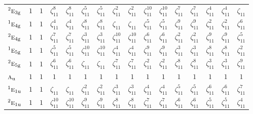 \documentclass[10pt,a4paper]{article}
\numberwithin{equation}{section}
\newcommand{\irr}[1]{\text{\normalfont\scshape #1}}
\newcommand{\conjpair}[1]{{}^{#1}}
\newcommand{\ptag}[1]{\mathrm{#1}}
\newcommand{\rootunity}[1]{\zeta_{#1}}
\begin{document}
{\begin{longtable}{@{}lccccccccccccccc@{}}
$\conjpair{2}\irr{e}_{3\ptag{g}}$ & $1$ & $1$ & $\rootunity{11}^{8}$ & $\rootunity{11}^{8}$ & $\rootunity{11}^{5}$ & $\rootunity{11}^{5}$ & $\rootunity{11}^{2}$ & $\rootunity{11}^{2}$ & $\rootunity{11}^{10}$ & $\rootunity{11}^{10}$ & $\rootunity{11}^{7}$ & $\rootunity{11}^{7}$ & $\rootunity{11}^{4}$ & $\rootunity{11}^{4}$ & $\rootunity{11}$\\
$\conjpair{1}\irr{e}_{4\ptag{g}}$ & $1$ & $1$ & $\rootunity{11}^{4}$ & $\rootunity{11}^{4}$ & $\rootunity{11}^{8}$ & $\rootunity{11}^{8}$ & $\rootunity{11}$ & $\rootunity{11}$ & $\rootunity{11}^{5}$ & $\rootunity{11}^{5}$ & $\rootunity{11}^{9}$ & $\rootunity{11}^{9}$ & $\rootunity{11}^{2}$ & $\rootunity{11}^{2}$ & $\rootunity{11}^{6}$\\
$\conjpair{2}\irr{e}_{4\ptag{g}}$ & $1$ & $1$ & $\rootunity{11}^{7}$ & $\rootunity{11}^{7}$ & $\rootunity{11}^{3}$ & $\rootunity{11}^{3}$ & $\rootunity{11}^{10}$ & $\rootunity{11}^{10}$ & $\rootunity{11}^{6}$ & $\rootunity{11}^{6}$ & $\rootunity{11}^{2}$ & $\rootunity{11}^{2}$ & $\rootunity{11}^{9}$ & $\rootunity{11}^{9}$ & $\rootunity{11}^{5}$\\
$\conjpair{1}\irr{e}_{5\ptag{g}}$ & $1$ & $1$ & $\rootunity{11}^{5}$ & $\rootunity{11}^{5}$ & $\rootunity{11}^{10}$ & $\rootunity{11}^{10}$ & $\rootunity{11}^{4}$ & $\rootunity{11}^{4}$ & $\rootunity{11}^{9}$ & $\rootunity{11}^{9}$ & $\rootunity{11}^{3}$ & $\rootunity{11}^{3}$ & $\rootunity{11}^{8}$ & $\rootunity{11}^{8}$ & $\rootunity{11}^{2}$\\
$\conjpair{2}\irr{e}_{5\ptag{g}}$ & $1$ & $1$ & $\rootunity{11}^{6}$ & $\rootunity{11}^{6}$ & $\rootunity{11}$ & $\rootunity{11}$ & $\rootunity{11}^{7}$ & $\rootunity{11}^{7}$ & $\rootunity{11}^{2}$ & $\rootunity{11}^{2}$ & $\rootunity{11}^{8}$ & $\rootunity{11}^{8}$ & $\rootunity{11}^{3}$ & $\rootunity{11}^{3}$ & $\rootunity{11}^{9}$\\
$\irr{a}_{\ptag{u}}$ & $1$ & $1$ & $1$ & $1$ & $1$ & $1$ & $1$ & $1$ & $1$ & $1$ & $1$ & $1$ & $1$ & $1$ & $1$\\
$\conjpair{1}\irr{e}_{1\ptag{u}}$ & $1$ & $1$ & $\rootunity{11}$ & $\rootunity{11}$ & $\rootunity{11}^{2}$ & $\rootunity{11}^{2}$ & $\rootunity{11}^{3}$ & $\rootunity{11}^{3}$ & $\rootunity{11}^{4}$ & $\rootunity{11}^{4}$ & $\rootunity{11}^{5}$ & $\rootunity{11}^{5}$ & $\rootunity{11}^{6}$ & $\rootunity{11}^{6}$ & $\rootunity{11}^{7}$\\
$\conjpair{2}\irr{e}_{1\ptag{u}}$ & $1$ & $1$ & $\rootunity{11}^{10}$ & $\rootunity{11}^{10}$ & $\rootunity{11}^{9}$ & $\rootunity{11}^{9}$ & $\rootunity{11}^{8}$ & $\rootunity{11}^{8}$ & $\rootunity{11}^{7}$ & $\rootunity{11}^{7}$ & $\rootunity{11}^{6}$ & $\rootunity{11}^{6}$ & $\rootunity{11}^{5}$ & $\rootunity{11}^{5}$ & $\rootunity{11}^{4}$\\

\end{longtable}}
\end{document}
